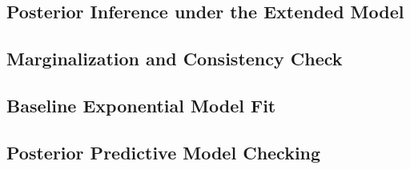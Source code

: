 \subsection{Posterior Inference under the Extended Model}



\subsection{Marginalization and Consistency Check}




\subsection{Baseline Exponential Model Fit}
\label{ecdf的分析}




\subsection{Posterior Predictive Model Checking}
